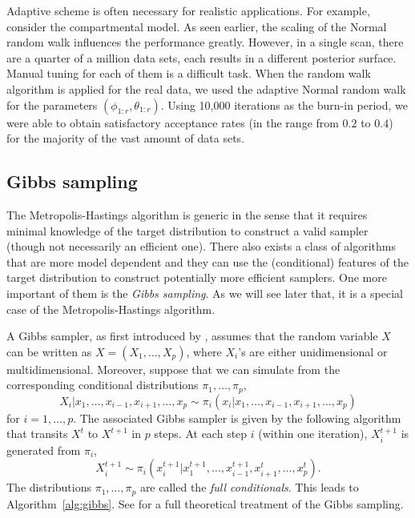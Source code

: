 Adaptive scheme is often necessary for realistic applications. For example,
consider the \pet compartmental model. As seen earlier, the scaling of the
Normal random walk influences the performance greatly. However, in a single
\pet scan, there are a quarter of a million data sets, each results in a
different posterior surface. Manual tuning for each of them is a difficult
task. When the random walk algorithm is applied for the real data, we used the
adaptive Normal random walk for the parameters $(\phi_{1:r},\theta_{1:r})$.
Using 10,000 iterations as the burn-in period, we were able to obtain
satisfactory acceptance rates (in the range from $0.2$ to $0.4$) for the
majority of the vast amount of data sets.

\subsection{Gibbs sampling}
\label{sub:Gibbs sampling}

The Metropolis-Hastings algorithm is generic in the sense that it requires
minimal knowledge of the target distribution to construct a valid sampler
(though not necessarily an efficient one). There also exists a class of \mcmc
algorithms that are more model dependent and they can use the (conditional)
features of the target distribution to construct potentially more efficient
samplers. One more important of them is the \emph{Gibbs sampling}. As we will
see later that, it is a special case of the Metropolis-Hastings algorithm.

A Gibbs sampler, as first introduced by \cite{Geman:1993bp}, assumes that the
random variable $X$ can be written as $X = (X_1,\dots,X_p)$, where $X_i$'s are
either unidimensional or multidimensional. Moreover, suppose that we can
simulate from the corresponding conditional distributions $\pi_1,\dots,\pi_p$,
\begin{equation}
  X_i|x_1,\dots,x_{i-1},x_{i+1},\dots,x_p
  \sim \pi_i(x_i|x_1,\dots,x_{i-1},x_{i+1},\dots,x_p)
\end{equation}
for $i = 1,\dots,p$. The associated Gibbs sampler is given by the following
algorithm that transits $X^t$ to $X^{t+1}$ in $p$ steps. At each step $i$
(within one iteration), $X_i^{t+1}$ is generated from $\pi_i$,
\begin{equation}
  X_i^{t+1} \sim
  \pi_i(x_i^{t+1}|x_1^{t+1},\dots,x_{i-1}^{t+1},x_{i+1}^t,\dots,x_p^t).
\end{equation}
The distributions $\pi_1,\dots,\pi_p$ are called the \emph{full conditionals}.
This leads to Algorithm~\ref{alg:gibbs}. See \cite[][chap.~8
and~9]{Robert:2004tn} for a full theoretical treatment of the Gibbs sampling.


